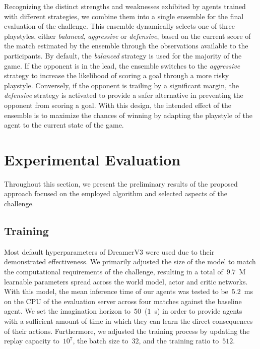 \documentclass{article}
\begin{document}
Recognizing the distinct strengths and weaknesses exhibited by agents trained with different strategies, we combine them into a single ensemble for the final evaluation of the challenge. This ensemble dynamically selects one of three playstyles, either \textit{balanced}, \textit{aggressive} or \textit{defensive}, based on the current score of the match estimated by the ensemble through the observations available to the participants. By default, the \textit{balanced} strategy is used for the majority of the game. If the opponent is in the lead, the ensemble switches to the \textit{aggressive} strategy to increase the likelihood of scoring a goal through a more risky playstyle. Conversely, if the opponent is trailing by a significant margin, the \textit{defensive} strategy is activated to provide a safer alternative in preventing the opponent from scoring a goal. With this design, the intended effect of the ensemble is to maximize the chances of winning by adapting the playstyle of the agent to the current state of the game.

\section{Experimental Evaluation}\label{sec:experimental-evaluation}

Throughout this section, we present the preliminary results of the proposed approach focused on the employed algorithm and selected aspects of the challenge.

\subsection{Training}\label{ssec:training}

Most default hyperparameters of DreamerV3 were used due to their demonstrated effectiveness. We primarily adjusted the size of the model to match the computational requirements of the challenge, resulting in a total of~\(9.7\)~M learnable parameters spread across the world model, actor and critic networks. With this model, the mean inference time of our agents was tested to be~\(5.2\)~ms on the CPU of the evaluation server across four matches against the baseline agent. We set the imagination horizon to~\(50\)~(\(1\)~s) in order to provide agents with a sufficient amount of time in which they can learn the direct consequences of their actions. Furthermore, we adjusted the training process by updating the replay capacity to~\(10^7\), the batch size to~\(32\), and the training ratio to~\(512\).
\end{document}
